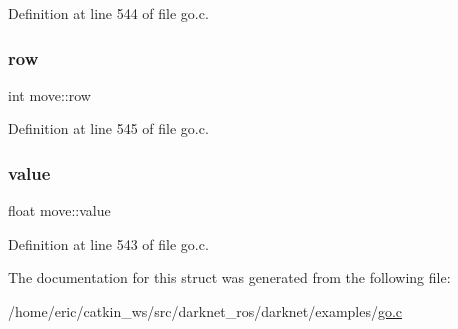 Definition at line 544 of file go.\+c.

\mbox{\label{structmove_aa437d87395d9a7ae28b49eb49c5fdfe9}} 
\subsubsection{\texorpdfstring{row}{row}}
{\footnotesize\ttfamily int move\+::row}



Definition at line 545 of file go.\+c.

\mbox{\label{structmove_ad5c6f0e63c04917e2136302cdc91c8c9}} 
\subsubsection{\texorpdfstring{value}{value}}
{\footnotesize\ttfamily float move\+::value}



Definition at line 543 of file go.\+c.



The documentation for this struct was generated from the following file\+:\begin{DoxyCompactItemize}
\item 
/home/eric/catkin\+\_\+ws/src/darknet\+\_\+ros/darknet/examples/\mbox{\hyperlink{go_8c}{go.\+c}}\end{DoxyCompactItemize}
